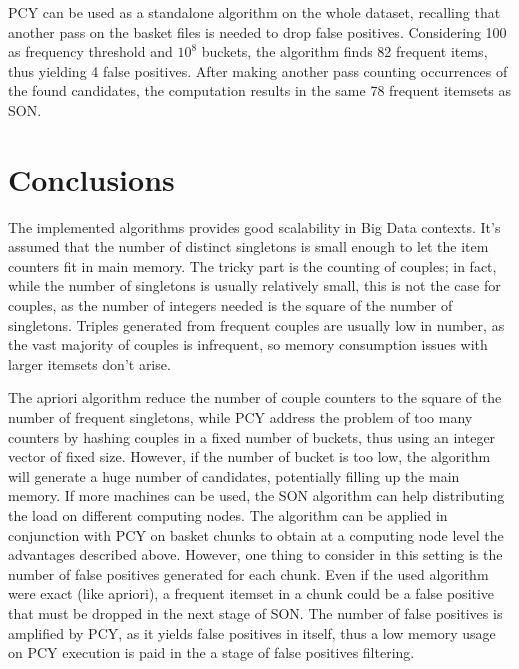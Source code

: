 \documentclass{article}
\begin{document}
PCY can be used as a standalone algorithm on the whole dataset, recalling that another pass on the basket files is needed to drop false positives. Considering 100 as frequency threshold and $10^8$ buckets, the algorithm finds 82 frequent items, thus yielding 4 false positives. After making another pass counting occurrences of the found candidates, the computation results in the same 78 frequent itemsets as SON.

\section{Conclusions}

The implemented algorithms provides good scalability in Big Data contexts. It's assumed that the number of distinct singletons is small enough to let the item counters fit in main memory. The tricky part is the counting of couples; in fact, while the number of singletons is usually relatively small, this is not the case for couples, as the number of integers needed is the square of the number of singletons. Triples generated from frequent couples are usually low in number, as the vast majority of couples is infrequent, so memory consumption issues with larger itemsets don't arise.

The apriori algorithm reduce the number of couple counters to the square of the number of frequent singletons, while PCY address the problem of too many counters by hashing couples in a fixed number of buckets, thus using an integer vector of fixed size. However, if the number of bucket is too low, the algorithm will generate a huge number of candidates, potentially filling up the main memory.
If more machines can be used, the SON algorithm can help distributing the load on different computing nodes. The algorithm can be applied in conjunction with PCY on basket chunks to obtain at a computing node level the advantages described above. However, one thing to consider in this setting is the number of false positives generated for each chunk. Even if the used algorithm were exact (like apriori), a frequent itemset in a chunk could be a false positive that must be dropped in the next stage of SON. The number of false positives is amplified by PCY, as it yields false positives in itself, thus a low memory usage on PCY execution is paid in the a stage of false positives filtering.
\end{document}
